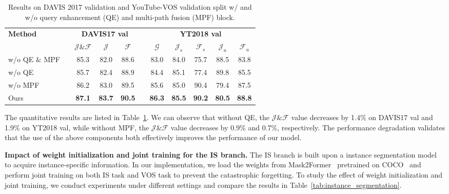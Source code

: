 \documentclass[10pt,twocolumn,letterpaper]{article}
\begin{document}
\begin{table}[!ht]
\centering
  \setlength{\tabcolsep}{0pt}
  \begin{tabular*}{\linewidth}{@{\extracolsep{\fill}}lc | cccc | ccccc @{}}
    \toprule
    \multirow{2}{0.6in}{\textbf{Method}} && \multicolumn{3}{c}{\textbf{DAVIS17 val}} && \multicolumn{5}{c}{\textbf{YT2018 val}}  \\
    ~ && $\mathcal{J\&F}$ & $\mathcal{J}$ & $\mathcal{F}$ &&  $\mathcal{G}$ & $\mathcal{J}_{s}$ & $\mathcal{F}_{s}$ & $\mathcal{J}_{u}$ & $\mathcal{F}_{u}$ \\
    \midrule
    w/o QE $\&$ MPF && 85.3 & 82.0 & 88.6 && 83.0 & 84.0 & 75.7 & 88.5 & 83.8 \\
    w/o QE && 85.7	& 82.4 & 88.9 && 84.4 & 85.1 & 77.4 & 89.8 & 85.5 \\
    w/o MPF && 86.2 & 83.0 & 89.5 && 85.6 & 85.0 & 90.4 & 79.4 & 87.5 \\
    Ours && \textbf{87.1} & \textbf{83.7} & \textbf{90.5} && \textbf{86.3} & \textbf{85.5} & \textbf{90.2} & \textbf{80.5} & \textbf{88.8} \\
    \bottomrule
  \end{tabular*}
  \vspace{-0.1in}
 \caption{Results on DAVIS 2017 validation and YouTube-VOS validation split w/ and w/o query enhancement (QE) and multi-path fusion (MPF) block. }
\label{tab:components}
\end{table}

The quantitative results are listed in Table~\ref{tab:components}. We can observe that without QE, the $\mathcal{J\&F}$ value decreases by 1.4\% on DAVIS17 val and 1.9\% on YT2018 val, while without MPF, the $\mathcal{J\&F}$ value decreases by 0.9\% and 0.7\%, respectively. The performance degradation validates that the use of the above components both effectively improves the performance of our model.

\vspace{0.02in}
\noindent \textbf{Impact of weight initialization and joint training for the IS branch.} The IS branch is built upon a instance segmentation model~\cite{cheng2022masked} to acquire instance-specific information. In our implementation, we load the weights from Mask2Former~\cite{cheng2022masked} pretrained on COCO~\cite{lin2014microsoft} and perform joint training on both IS task and VOS task to prevent the catastrophic forgetting. To study the effect of weight initialization and joint training, we conduct experiments under different settings and compare the results in Table~\ref{tab:instance_segmentation}.
\end{document}
